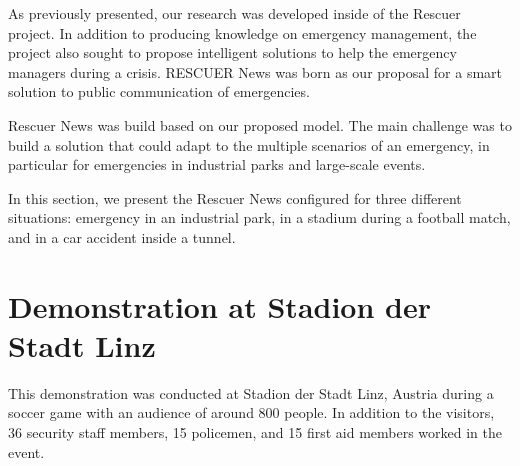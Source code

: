   \label{chapter:proofConcept}

 
As previously presented, our research was developed inside of the Rescuer project. In addition to producing knowledge on emergency management, the project also sought to propose intelligent solutions to help the emergency managers during a crisis. RESCUER News was born as our proposal for a smart solution to public communication of emergencies. 

Rescuer News was build based on our proposed model. The main challenge was to build a solution that could adapt to the multiple scenarios of an emergency, in particular for emergencies in industrial parks and large-scale events.

In this section, we present the Rescuer News configured for three different situations: emergency in an industrial park, in a stadium during a football match, and in a car accident inside a tunnel.





\section{Demonstration at Stadion der Stadt Linz}

This demonstration was conducted at Stadion der Stadt Linz, Austria during a soccer game with an audience of around 800 people. In addition to the visitors, 36 security staff members, 15 policemen, and 15 first aid members worked in the event. 

